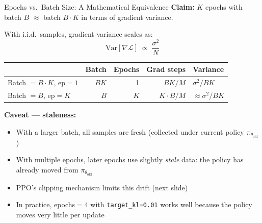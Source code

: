 \documentclass[aspectratio=169,11pt]{beamer}
\begin{document}
\begin{frame}{Epochs vs.\ Batch Size: A Mathematical Equivalence}
  \small
  \textbf{Claim:} $K$ epochs with batch $B$ $\approx$ batch $B \cdot K$ in terms of gradient variance.

  \medskip
  With i.i.d.\ samples, gradient variance scales as:
  \[
    \mathrm{Var}[\nabla \mathcal{L}] \;\propto\; \frac{\sigma^2}{N}
  \]

  \begin{center}
  \begin{tabular}{lrrrl}
    \toprule
    & \textbf{Batch} & \textbf{Epochs} & \textbf{Grad steps} & \textbf{Variance} \\
    \midrule
    Batch $= B \cdot K$, ep${}=1$ & $BK$ & 1 & $BK / M$ & $\sigma^2 / BK$ \\
    Batch $= B$, ep${}=K$ & $B$ & $K$ & $K \cdot B / M$ & $\approx \sigma^2 / BK$ \\
    \bottomrule
  \end{tabular}
  \end{center}

  \medskip
  \textbf{Caveat --- staleness:}
  \begin{itemize}\setlength\itemsep{1pt}
    \item With a larger batch, all samples are fresh (collected under current policy $\pi_{\theta_\text{old}}$)
    \item With multiple epochs, later epochs use slightly \emph{stale} data:
      the policy has already moved from $\pi_{\theta_\text{old}}$
    \item PPO's clipping mechanism limits this drift (next slide)
    \item In practice, epochs${}=4$ with \texttt{target\_kl=0.01} works well because
      the policy moves very little per update
  \end{itemize}
\end{frame}
\end{document}
